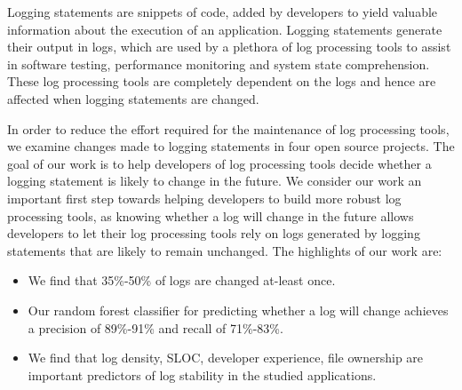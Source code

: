 Logging statements are snippets of code, added by developers to yield valuable information about the execution of an application. Logging statements generate their output in logs, which are used by a plethora of log processing tools to assist in software testing, performance monitoring and system state comprehension. These log processing tools are completely dependent on the logs and hence are affected when logging statements are changed.

In order to reduce the effort required for the maintenance of log processing tools, we examine changes made to logging statements in four open source projects. The goal of our work is to help developers of log processing tools decide whether a logging statement is likely to change in the future. We consider our work an important first step towards helping developers to build more robust log processing tools, as knowing whether a log will change in the future allows developers to let their log processing tools rely on logs generated by logging statements that are likely to remain unchanged. The highlights of our work are:


\begin{itemize}
	\item {} We find that 35\%-50\% of logs are changed at-least once.
	\item {} Our random forest classifier for predicting whether a log will change achieves a precision of 89\%-91\% and recall of 71\%-83\%. 
	\item {} We find that log density, SLOC, developer experience, file ownership are important predictors of log stability in the studied applications.  	
	
\end{itemize}




